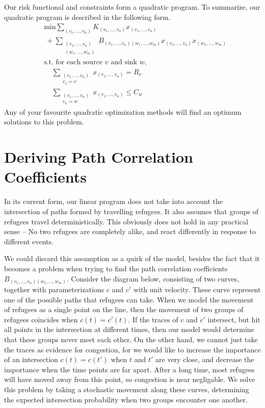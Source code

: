 \documentclass{article}
\begin{document}
\begin{enumerate}
Our risk functional and constraints form a quadratic program. To summarize, our quadratic program is described in the following form.
%
\begin{align*}
    &\text{min} \sum_{(v_1, \dots, v_n)} K_{(v_1, \dots, v_n)} x_{(v_1, \dots, v_n)}\\
    & \ + \sum_{\substack{(v_1, \dots, v_n)\\(w_1, \dots, w_m)}} B_{(v_1, \dots, v_n) (w_1, \dots, w_m)} x_{(v_1, \dots, v_n)} x_{(w_1, \dots, w_m)}\\
    &\text{s.t. for each source $v$ and sink $w$,}\\
    &\ \ \ \ \ \sum_{\substack{(v_1, \dots, v_n) \\ v_1 = v}} x_{(v_1, \dots, v_n)} = R_v\\
    &\ \ \ \ \ \sum_{\substack{(v_1, \dots, v_n) \\ v_n = w}} x_{(v_1, \dots, v_n)} \leq C_w
\end{align*}
%
Any of your favourite quadratic optimization methods will find an optimum solutions to this problem.

\section{Deriving Path Correlation Coefficients}

In its current form, our linear program does not take into account the intersection of paths formed by travelling refugees. It also assumes that groups of refugees travel deterministically. This obviously does not hold in any practical sense -- No two refugees are completely alike, and react differently in response to different events.

We could discard this assumption as a quirk of the model, besides the fact that it becomes a problem when trying to find the path correlation coefficients $B_{(v_1, \dots, v_n) (w_1, \dots, w_m)}$. Consider the diagram below, consisting of two curves, together with parameterizations $c$ and $c'$ with unit velocity. These curve represent one of the possible paths that refugees can take. When we model the movement of refugees as a single point on the line, then the movement of two groups of refugees coincides when $c(t) = c'(t)$. If the traces of $c$ and $c'$ intersect, but hit all points in the intersection at different times, then our model would determine that these groups never meet each other. On the other hand, we cannot just take the traces as evidence for congestion, for we would like to increase the importance of an intersection $c(t) = c(t')$ when $t$ and $t'$ are very close, and decrease the importance when the time points are far apart. After a long time, most refugees will have moved away from this point, so congestion is near negligable. We solve this problem by taking a stochastic movement along these curves, determining the expected intersection probability when two groups encounter one another.


\end{enumerate}
\end{document}
